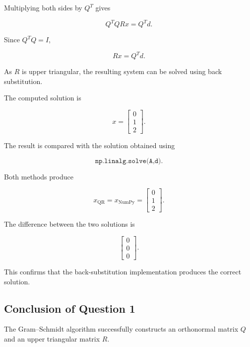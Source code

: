 \documentclass[12pt,a4paper]{article}
\numberwithin{equation}{section}
\begin{document}
Multiplying both sides by $Q^T$ gives

\begin{equation}
Q^TQRx=Q^Td.
\end{equation}

Since $Q^TQ=I$,

\begin{equation}
Rx=Q^Td.
\end{equation}

As $R$ is upper triangular, the resulting
system can be solved using back substitution.

The computed solution is

\begin{equation}
\boxed{
x=
\begin{bmatrix}
0\\1\\2
\end{bmatrix}
}.
\end{equation}

The result is compared with the solution obtained
using

\begin{equation}
\texttt{np.linalg.solve(A,d)}.
\end{equation}

Both methods produce

\begin{equation}
x_{\mathrm{QR}}=
x_{\mathrm{NumPy}}=
\begin{bmatrix}
0\\1\\2
\end{bmatrix}.
\end{equation}

The difference between the two solutions is

\begin{equation}
\begin{bmatrix}
0\\0\\0
\end{bmatrix}.
\end{equation}

This confirms that the back-substitution
implementation produces the correct solution.

\subsection{Conclusion of Question 1}

The Gram--Schmidt algorithm successfully
constructs an orthonormal matrix $Q$ and an
upper triangular matrix $R$.
\end{document}
